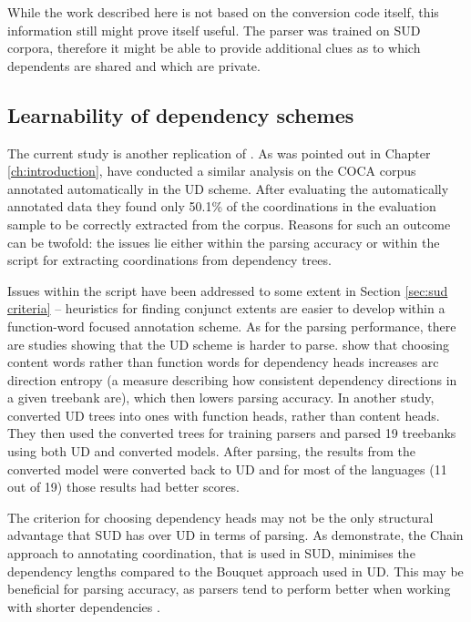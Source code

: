 While the work described here is not based on the conversion code itself, this information still might prove itself useful. The parser was trained on SUD corpora, therefore it might be able to provide additional clues as to which dependents are shared and which are private. 

\subsection{Learnability of dependency schemes}\label{sec:learnability}
The current study is another replication of \cite{prz:woz:23}. As was pointed out in Chapter \ref{ch:introduction}, \cite{pbg2023} have conducted a similar analysis on the COCA corpus annotated automatically in the UD scheme. After evaluating the automatically annotated data they found only 50.1\% of the coordinations in the evaluation sample to be correctly extracted from the corpus. Reasons for such an outcome can be twofold: the issues lie either within the parsing accuracy or within the script for extracting coordinations from dependency trees. 

Issues within the script have been addressed to some extent in Section \ref{sec:sud criteria} -- heuristics for finding conjunct extents are easier to develop within a function-word focused annotation scheme. As for the parsing performance, there are studies showing that the UD scheme is harder to parse. \cite{rehbein-etal-2017-universal} show that choosing content words rather than function words for dependency heads increases arc direction entropy (a measure describing how consistent dependency directions in a given treebank are), which then lowers parsing accuracy. In another study, \cite{kohita-etal-2017-multilingual} converted UD trees into ones with function heads, rather than content heads. They then used the converted trees for training parsers and parsed 19 treebanks using both UD and converted models. After parsing, the results from the converted model were converted back to UD and for most of the languages (11 out of 19) those results had better scores. 

The criterion for choosing dependency heads may not be the only structural advantage that SUD has over UD in terms of parsing. As \cite{gerdes-etal-2018-sud} demonstrate, the Chain approach to annotating coordination, that is used in SUD, minimises the dependency lengths compared to the Bouquet approach used in UD. This may be beneficial for parsing accuracy, as parsers tend to perform better when working with shorter dependencies \citep{nilsson-etal-2006-graph, eisner-smith-2005-parsing}. 

